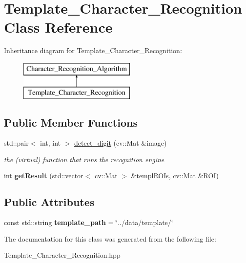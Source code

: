 \hypertarget{class_template___character___recognition}{}\section{Template\+\_\+\+Character\+\_\+\+Recognition Class Reference}
\label{class_template___character___recognition}
Inheritance diagram for Template\+\_\+\+Character\+\_\+\+Recognition\+:\begin{figure}[H]
\begin{center}
\leavevmode
\includegraphics[height=2.000000cm]{class_template___character___recognition}
\end{center}
\end{figure}
\subsection*{Public Member Functions}
\begin{DoxyCompactItemize}
\item 
\mbox{\label{class_template___character___recognition_af41bc392058896b69802f690e42661dc}} 
std\+::pair$<$ int, int $>$ \mbox{\hyperlink{class_template___character___recognition_af41bc392058896b69802f690e42661dc}{detect\+\_\+digit}} (cv\+::\+Mat \&image)
\begin{DoxyCompactList}\small\item\em the (virtual) function that runs the recognition engine \end{DoxyCompactList}\item 
\mbox{\label{class_template___character___recognition_a0af8778b93c92849d3413f2b3d0333bd}} 
int {\bfseries get\+Result} (std\+::vector$<$ cv\+::\+Mat $>$ \&templ\+R\+O\+Is, cv\+::\+Mat \&R\+OI)
\end{DoxyCompactItemize}
\subsection*{Public Attributes}
\begin{DoxyCompactItemize}
\item 
\mbox{\label{class_template___character___recognition_aa4cb4d3779f7d7a65ae5811f78be880b}} 
const std\+::string {\bfseries template\+\_\+path} = \char`\"{}../data/template/\char`\"{}
\end{DoxyCompactItemize}


The documentation for this class was generated from the following file\+:\begin{DoxyCompactItemize}
\item 
Template\+\_\+\+Character\+\_\+\+Recognition.\+hpp\end{DoxyCompactItemize}
